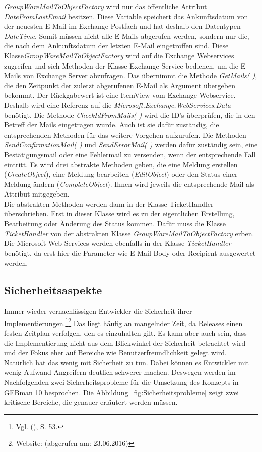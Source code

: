 \noindent
\textit{GroupWareMailToObjectFactory} wird nur das öffentliche Attribut \textit{DateFromLastEmail} besitzen. Diese Variable speichert das Ankunftsdatum von der neuesten E-Mail im Exchange Postfach und hat deshalb den Datentypen \textit{DateTime}. Somit müssen nicht alle E-Mails abgerufen werden, sondern nur die, die nach dem Ankunftsdatum der letzten E-Mail eingetroffen sind.\newline
Diese Klasse\textit{GroupWareMailToObjectFactory} wird auf die Exchange Webservices zugreifen und sich Methoden der Klasse Exchange Service bedienen, um die E-Mails von Exchange Server abzufragen. Das übernimmt die Methode \textit{GetMails( )}, die den Zeitpunkt der zuletzt abgerufenen E-Mail als Argument übergeben bekommt. Der Rückgabewert ist eine ItemView vom Exchange Webservice. Deshalb wird eine Referenz auf die \textit{Microsoft.Exchange.WebServices.Data} benötigt.
\newline 
Die Methode \textit{CheckIdFromMails( )} wird die ID's überprüfen, die in den Betreff der Mails eingetragen wurde. Auch ist sie dafür zuständig, die entsprechenden Methoden für das weitere Vorgehen aufzurufen. Die Methoden \textit{SendConfirmationMail( )} und \textit{SendErrorMail( )} werden dafür zuständig sein, eine Bestätigungsmail oder eine Fehlermail zu versenden, wenn der entsprechende Fall eintritt. Es wird drei abstrakte Methoden geben, die eine Meldung erstellen (\textit{CreateObject}), eine Meldung bearbeiten (\textit{EditObject}) oder den Status einer Meldung ändern (\textit{CompleteObject}). Ihnen wird jeweils die entsprechende Mail als Attribut mitgegeben.\\

\noindent
Die abstrakten Methoden werden dann in der Klasse TicketHandler überschrieben. Erst in dieser Klasse wird es zu der eigentlichen Erstellung, Bearbeitung oder Änderung des Status kommen. Dafür muss die Klasse \textit{TicketHandler} von der abstrakten Klasse \textit{GroupWareMailToObjectFactory} erben. Die Microsoft Web Services werden ebenfalls in der Klasse \textit{TicketHandler} benötigt, da erst hier die Parameter wie E-Mail-Body oder Recipient ausgewertet werden.\\


\subsection{Sicherheitsaspekte}
\noindent
Immer wieder vernachlässigen Entwickler die Sicherheit ihrer Implementierungen.\footnote{Vgl. \citeauthor{Ziegler} (\citeyear{Ziegler}), S. 53.}\footnote{Website: \citeauthor{Sicherheit} (abgerufen am: 23.06.2016)} Das liegt häufig an mangelnder Zeit, da Releases einen festen Zeitplan verfolgen, den es einzuhalten gilt. Es kann aber auch sein, dass die Implementierung nicht aus dem Blickwinkel der Sicherheit betrachtet wird und der Fokus eher auf Bereiche wie Benutzerfreundlichkeit gelegt wird. Natürlich hat das wenig mit Sicherheit zu tun. Dabei können es Entwickler mit wenig Aufwand Angreifern deutlich schwerer machen. Deswegen werden im Nachfolgenden zwei Sicherheitsprobleme für die Umsetzung des Konzepts in GEBman 10 besprochen. Die Abbildung~\ref{fig:Sicherheitsprobleme} zeigt zwei kritische Bereiche, die genauer erläutert werden müssen.

